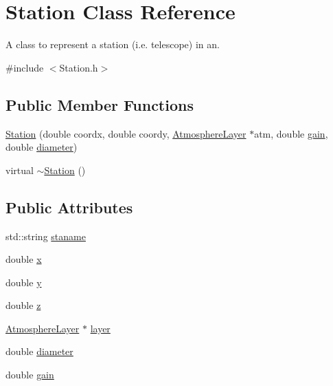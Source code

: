 \hypertarget{classStation}{
\section{Station Class Reference}
\label{classStation}
}


A class to represent a station (i.e. telescope) in an.  




{\ttfamily \#include $<$Station.h$>$}

\subsection*{Public Member Functions}
\begin{DoxyCompactItemize}
\item 
\hyperlink{classStation_ac9951896c7d68a95787c50e1d5ac94d6}{Station} (double coordx, double coordy, \hyperlink{classAtmosphereLayer}{AtmosphereLayer} $\ast$atm, double \hyperlink{classStation_a132660da885c826d92750aee2e469cfe}{gain}, double \hyperlink{classStation_aa7b65ca1b24be6b9b071097d5581054c}{diameter})
\item 
virtual \hyperlink{classStation_a00434e79e8ee7f4ebd6d3b631dde5ac0}{$\sim$Station} ()
\end{DoxyCompactItemize}
\subsection*{Public Attributes}
\begin{DoxyCompactItemize}
\item 
std::string \hyperlink{classStation_a0522258bd22862151977578f38f6afb0}{staname}
\item 
double \hyperlink{classStation_ac1d5d46d39015ec4522003bef2aec3b9}{x}
\item 
double \hyperlink{classStation_a2ecc6909273662f773e27c7c56c1f658}{y}
\item 
double \hyperlink{classStation_a4e9ba13f4bdfd32b9c8cfac08a4bf24a}{z}
\item 
\hyperlink{classAtmosphereLayer}{AtmosphereLayer} $\ast$ \hyperlink{classStation_aad67aa8d99ed867ff834ef644ef4f511}{layer}
\item 
double \hyperlink{classStation_aa7b65ca1b24be6b9b071097d5581054c}{diameter}
\item 
double \hyperlink{classStation_a132660da885c826d92750aee2e469cfe}{gain}
\end{DoxyCompactItemize}


